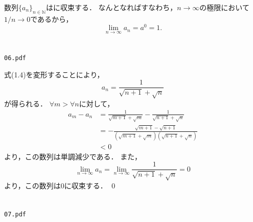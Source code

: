 \documentclass[uplatex,11pt]{jsarticle}
\def\shoumon#1{\vspace{1em}\noindent\ovalbox{\textsf{ #1 }}}
\begin{document}
\shoumon{(4)}

数列$\{a_n\}_{n \in \mathbb{N}}$はに収束する．
なんとなればすなわち，$n \longrightarrow \infty$の極限において
$1/n \longrightarrow 0$であるから，
\begin{equation*}
	\lim_{n\rightarrow \infty} a_n = a^0 = 1.
\end{equation*}


\newpage
\section{}

\begin{shadebox}
	\begin{center}
		\texttt{06.pdf}
	\end{center}
\end{shadebox}
\vspace{5mm}

式(1.4)を変形することにより，
\begin{equation*}
a_n = \frac{1}{\sqrt{n+1}+\sqrt{n}}
\end{equation*}
が得られる．
$\forall m > \forall n$に対して，
\begin{align*}
	a_m - a_n
	& = \frac{1}{\sqrt{m+1}+\sqrt{m}} - \frac{1}{\sqrt{n+1}+\sqrt{n}} \\
	& = -\frac{\sqrt{m+1}-\sqrt{n+1}}{(\sqrt{m+1}+\sqrt{m})(\sqrt{n+1}+\sqrt{n})} \\
	& < 0
\end{align*}
より，この数列は単調減少である．
また，
\begin{equation*}
	\lim_{n\rightarrow \infty} a_n
	= \lim_{n\rightarrow \infty} \frac{1}{\sqrt{n+1}+\sqrt{n}}
	= 0
\end{equation*}
より，この数列は0に収束する．
\qed

\newpage
\section{}

\begin{shadebox}
	\begin{center}
		\texttt{07.pdf}
	\end{center}
\end{shadebox}

\shoumon{(1)}
\end{document}
